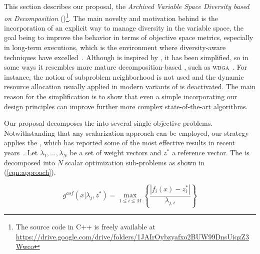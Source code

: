 
This section describes our proposal, the \textit{Archived Variable Space Diversity \MOEA{} based on Decomposition} (\AVSDMOEAD{})\footnote{\scriptsize The source code in C++ is freely available at \url{https://drive.google.com/drive/folders/1JAIrOybzyafxo2BUW99DnsUiqzZ3Wwco}}.
%
The main novelty and motivation behind \AVSDMOEAD{} is the incorporation of an explicit way to manage diversity in the variable space,
the goal being to improve the behavior in terms of objective space metrics, especially in long-term executions, which is the
environment where diversity-aware techniques have excelled~\cite{segura2015novel}.
%
Although \AVSDMOEAD{} is inspired by \MOEAD{}, it has been simplified, so in some ways it resembles more mature
decomposition-based \MOEAS{}, such as \textsc{wbga}~\cite{Hajela:93}.
%
For instance, the notion of subproblem neighborhood is not used and the dynamic resource allocation usually applied in modern variants
of \MOEAD{} is deactivated.
%
The main reason for the simplification is to show that even a simple \MOEA{} incorporating our design principles can
improve further more complex state-of-the-art algorithms.
%

Our proposal decomposes the \MOP{} into several single-objective problems.
%
Notwithstanding that any scalarization approach can be employed, our strategy applies the \ASF{}, 
which has reported some of the most effective results in recent years~\cite{hernandez2015improved}.
%
Let $\lambda_1, ..., \lambda_N$ be a set of weight vectors and $z^*$ a reference vector.
The \MOP{} is decomposed into $N$ scalar optimization sub-problems as shown in (\ref{eqn:approach}).
%

\begin{equation}\label{eqn:approach}
\displaystyle{
 g^{asf}(x| \lambda_j, z^*) = \max_{ 1 \leq i \leq M} \left \{ \frac{ | f_i(x) - z_i^*|}{\lambda_{j,i}} \right \} 
}
\end{equation}

